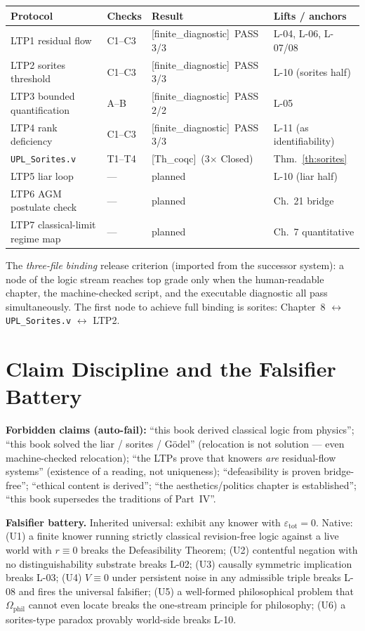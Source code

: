 \documentclass[11pt,a4paper,twoside]{book}
\newcommand{\tier}[1]{\textnormal{\small\textsf{[#1]}}}
\newcommand{\coq}{\tier{Th\_coqc}}\newcommand{\fd}{\tier{finite\_diagnostic}}
\theoremstyle{plain}
\theoremstyle{definition}
\theoremstyle{remark}
\begin{document}
\begin{center}
\begin{tabular}{@{}llll@{}}
\toprule
Protocol & Checks & Result & Lifts / anchors\\
\midrule
LTP1 residual flow & C1--C3 & \fd\ PASS 3/3 & L-04, L-06, L-07/08\\
LTP2 sorites threshold & C1--C3 & \fd\ PASS 3/3 & L-10 (sorites half)\\
LTP3 bounded quantification & A--B & \fd\ PASS 2/2 & L-05\\
LTP4 rank deficiency & C1--C3 & \fd\ PASS 3/3 & L-11 (as identifiability)\\
\texttt{UPL\_Sorites.v} & T1--T4 & \coq\ (3$\times$ Closed) & Thm.~\ref{th:sorites}\\
\midrule
LTP5 liar loop & --- & planned & L-10 (liar half)\\
LTP6 AGM postulate check & --- & planned & Ch.~21 bridge\\
LTP7 classical-limit regime map & --- & planned & Ch.~7 quantitative\\
\bottomrule
\end{tabular}
\end{center}

The \emph{three-file binding} release criterion (imported from the successor
system): a node of the logic stream reaches top grade only when the
human-readable chapter, the machine-checked script, and the executable
diagnostic all pass simultaneously. The first node to achieve full binding
is sorites: Chapter~8 $\leftrightarrow$ \texttt{UPL\_Sorites.v}
$\leftrightarrow$ LTP2.

\chapter{Claim Discipline and the Falsifier Battery}

\textbf{Forbidden claims (auto-fail):} ``this book derived classical logic
from physics''; ``this book solved the liar / sorites / G\"odel''
(relocation is not solution --- even machine-checked relocation); ``the LTPs
prove that knowers \emph{are} residual-flow systems'' (existence of a
reading, not uniqueness); ``defeasibility is proven bridge-free''; ``ethical
content is derived''; ``the aesthetics/politics chapter is established'';
``this book supersedes the traditions of Part~IV''.

\textbf{Falsifier battery.} Inherited universal: exhibit any knower with
$\varepsilon_{\mathrm{tot}}=0$. Native: (U1) a finite knower running strictly
classical revision-free logic against a live world with $r\equiv0$ breaks the
Defeasibility Theorem; (U2) contentful negation with no distinguishability
substrate breaks L-02; (U3) causally symmetric implication breaks L-03; (U4)
$V\equiv0$ under persistent noise in any admissible triple breaks L-08 and
fires the universal falsifier; (U5) a well-formed philosophical problem that
$\Omega_{\mathrm{phil}}$ cannot even locate breaks the one-stream principle
for philosophy; (U6) a sorites-type paradox provably world-side breaks L-10.
\end{document}
